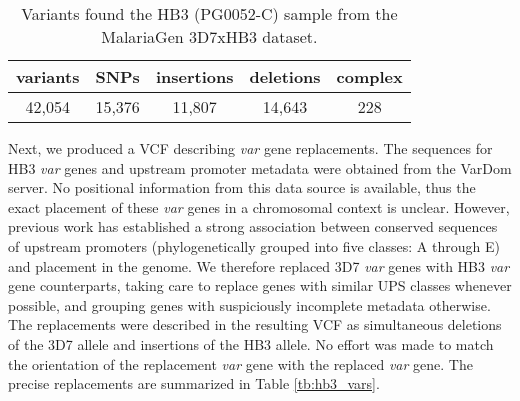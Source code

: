 \begin{table}[]
\centering
\caption{Variants found the HB3 (PG0052-C) sample from the MalariaGen 3D7xHB3 dataset.}
\label{tb:hb3_variants}
\begin{tabular}{@{}ccccc@{}}
\toprule
variants & SNPs   & insertions & deletions & complex \\
\midrule
42,054   & 15,376 & 11,807     & 14,643    & 228     \\
\bottomrule
\end{tabular}
\end{table}

Next, we produced a VCF describing \textit{var} gene replacements.  The sequences for HB3 \textit{var} genes and upstream promoter metadata were obtained from the VarDom server\cite{Rask:2010fi}.  No positional information from this data source is available, thus the exact placement of these \textit{var} genes in a chromosomal context is unclear.  However, previous work has established a strong association between conserved sequences of upstream promoters (phylogenetically grouped into five classes: A through E) and placement in the genome\cite{Kraemer:2006gv}.  We therefore replaced 3D7 \textit{var} genes with HB3 \textit{var} gene counterparts, taking care to replace genes with similar UPS classes whenever possible, and grouping genes with suspiciously incomplete metadata otherwise. The replacements were described in the resulting VCF as simultaneous deletions of the 3D7 allele and insertions of the HB3 allele.  No effort was made to match the orientation of the replacement \textit{var} gene with the replaced \textit{var} gene. The precise replacements are summarized in Table \ref{tb:hb3_vars}.

